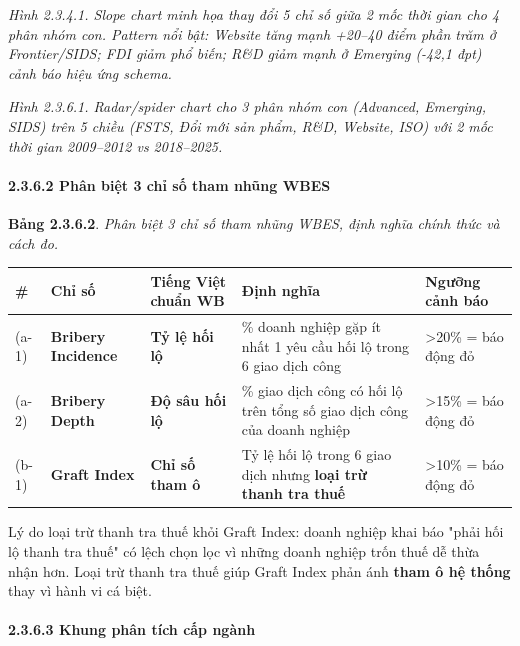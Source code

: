 \documentclass[12pt,a4paper]{article}
\begin{document}
\emph{Hình 2.3.4.1. Slope chart minh họa thay đổi 5 chỉ số giữa 2 mốc
thời gian cho 4 phân nhóm con. Pattern nổi bật: Website tăng mạnh
+20--40 điểm phần trăm ở Frontier/SIDS; FDI giảm phổ biến; R\&D giảm
mạnh ở Emerging (-42,1 đpt) cảnh báo hiệu ứng schema.}

\emph{Hình 2.3.6.1. Radar/spider chart cho 3 phân nhóm con (Advanced,
Emerging, SIDS) trên 5 chiều (FSTS, Đổi mới sản phẩm, R\&D, Website,
ISO) với 2 mốc thời gian 2009--2012 vs 2018--2025.}

\hypertarget{2362-phuxe2n-biux1ec7t-3-chux1ec9-sux1ed1-tham-nhux169ng-wbes}{%
\paragraph{2.3.6.2 Phân biệt 3 chỉ số tham nhũng
WBES}\label{2362-phuxe2n-biux1ec7t-3-chux1ec9-sux1ed1-tham-nhux169ng-wbes}}

\textbf{Bảng 2.3.6.2}. \emph{Phân biệt 3 chỉ số tham nhũng WBES, định
nghĩa chính thức và cách đo.}

\begin{longtable}[]{@{}lllll@{}}
\toprule\noalign{}
\# & Chỉ số & Tiếng Việt chuẩn WB & Định nghĩa & Ngưỡng cảnh báo \\
\midrule\noalign{}
\endhead
\bottomrule\noalign{}
\endlastfoot
(a-1) & \textbf{Bribery Incidence} & \textbf{Tỷ lệ hối lộ} & \% doanh
nghiệp gặp ít nhất 1 yêu cầu hối lộ trong 6 giao dịch công &
\textgreater20\% = báo động đỏ \\
(a-2) & \textbf{Bribery Depth} & \textbf{Độ sâu hối lộ} & \% giao dịch
công có hối lộ trên tổng số giao dịch công của doanh nghiệp &
\textgreater15\% = báo động đỏ \\
(b-1) & \textbf{Graft Index} & \textbf{Chỉ số tham ô} & Tỷ lệ hối lộ
trong 6 giao dịch nhưng \textbf{loại trừ thanh tra thuế} &
\textgreater10\% = báo động đỏ \\
\end{longtable}

Lý do loại trừ thanh tra thuế khỏi Graft Index: doanh nghiệp khai báo
"phải hối lộ thanh tra thuế" có lệch chọn lọc vì những doanh nghiệp trốn
thuế dễ thừa nhận hơn. Loại trừ thanh tra thuế giúp Graft Index phản ánh
\textbf{tham ô hệ thống} thay vì hành vi cá biệt.

\hypertarget{2363-khung-phuxe2n-tuxedch-cux1ea5p-nguxe0nh}{%
\paragraph{2.3.6.3 Khung phân tích cấp
ngành}\label{2363-khung-phuxe2n-tuxedch-cux1ea5p-nguxe0nh}}
\end{document}
